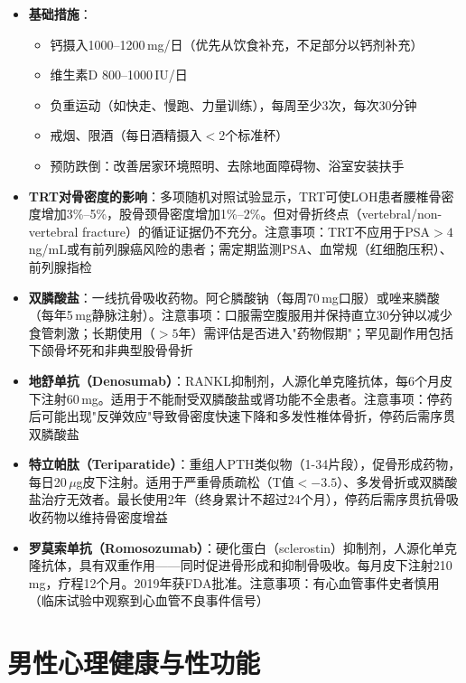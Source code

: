 \begin{itemize}[leftmargin=2cm]
	\item \textbf{基础措施}：
	\begin{itemize}
		\item 钙摄入1000--1200\,mg/日（优先从饮食补充，不足部分以钙剂补充）
		\item 维生素D 800--1000\,IU/日
		\item 负重运动（如快走、慢跑、力量训练），每周至少3次，每次30分钟
		\item 戒烟、限酒（每日酒精摄入$<$2个标准杯）
		\item 预防跌倒：改善居家环境照明、去除地面障碍物、浴室安装扶手
	\end{itemize}

	\item \textbf{TRT对骨密度的影响}：多项随机对照试验显示，TRT可使LOH患者腰椎骨密度增加3\%--5\%，股骨颈骨密度增加1\%--2\%。但对骨折终点（vertebral/non-vertebral fracture）的循证证据仍不充分。注意事项：TRT不应用于PSA$>4\,$ng/mL或有前列腺癌风险的患者；需定期监测PSA、血常规（红细胞压积）、前列腺指检

	\item \textbf{双膦酸盐}：一线抗骨吸收药物。阿仑膦酸钠（每周70\,mg口服）或唑来膦酸（每年5\,mg静脉注射）。注意事项：口服需空腹服用并保持直立30分钟以减少食管刺激；长期使用（$>5$年）需评估是否进入"药物假期"；罕见副作用包括下颌骨坏死和非典型股骨骨折

	\item \textbf{地舒单抗（Denosumab）}：RANKL抑制剂，人源化单克隆抗体，每6个月皮下注射60\,mg。适用于不能耐受双膦酸盐或肾功能不全患者。注意事项：停药后可能出现"反弹效应"导致骨密度快速下降和多发性椎体骨折，停药后需序贯双膦酸盐

	\item \textbf{特立帕肽（Teriparatide）}：重组人PTH类似物（1-34片段），促骨形成药物，每日20\,$\mu$g皮下注射。适用于严重骨质疏松（T值$< -3.5$）、多发骨折或双膦酸盐治疗无效者。最长使用2年（终身累计不超过24个月），停药后需序贯抗骨吸收药物以维持骨密度增益

	\item \textbf{罗莫索单抗（Romosozumab）}：硬化蛋白（sclerostin）抑制剂，人源化单克隆抗体，具有双重作用——同时促进骨形成和抑制骨吸收。每月皮下注射210\,mg，疗程12个月。2019年获FDA批准。注意事项：有心血管事件史者慎用（临床试验中观察到心血管不良事件信号）
\end{itemize}

\section{男性心理健康与性功能}
\label{sec:male_mental_health}

